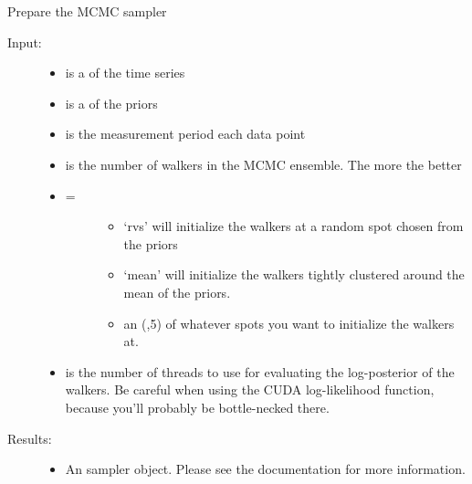 \documentclass[letterpaper,10pt,english]{sphinxmanual}
\begin{document}
\begin{fulllineitems}
\label{code_mcmc:mcmc.setup}
Prepare the MCMC sampler
\begin{description}
\item[{Input:}] \leavevmode\begin{itemize}
\item {} 
 is a  of the time series

\item {} 
 is a  of the priors

\item {} 
 is the measurement period each data point

\item {} 
 is the number of walkers in the MCMC ensemble. The more the better

\item {} \begin{description}
\item[{ =}] \leavevmode\begin{itemize}
\item {} 
`rvs' will initialize the walkers at a random spot chosen from the priors

\item {} 
`mean' will initialize the walkers tightly clustered around the mean of the priors.

\item {} 
an (,5)  of whatever spots you want to initialize the walkers at.

\end{itemize}

\end{description}

\item {} 
 is the number of threads to use for evaluating the log-posterior of the walkers. Be careful when using the CUDA log-likelihood function, because you'll probably be bottle-necked there.

\end{itemize}

\item[{Results:}] \leavevmode\begin{itemize}
\item {} 
An  sampler object. Please see the  documentation for more information.

\end{itemize}

\end{description}

\end{fulllineitems}
\end{document}
